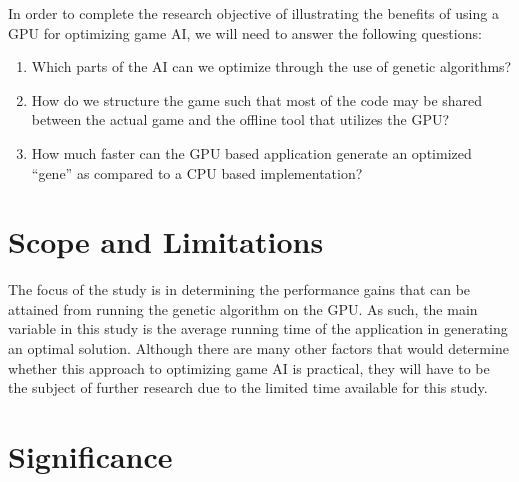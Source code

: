 In order to complete the research objective of illustrating the benefits of using
a GPU for optimizing game AI, we will need to answer the following questions:

\begin{enumerate}
 \item Which parts of the AI can we optimize through the use of genetic algorithms?

 \item How do we structure the game such that most of the code may be shared between
the actual game and the offline tool that utilizes the GPU?

 \item How much faster can the GPU based application generate an optimized ``gene''
as compared to a CPU based implementation?
\end{enumerate}

\section{Scope and Limitations}

The focus of the study is in determining the performance gains that can be attained from
running the genetic algorithm on the GPU. As such, the main variable in this study is the
average running time of the application in generating an optimal solution. Although there
are many other factors that would determine whether this approach to optimizing game AI
is practical, they will have to be the subject of further research due to the limited time
available for this study.


\section{Significance}

